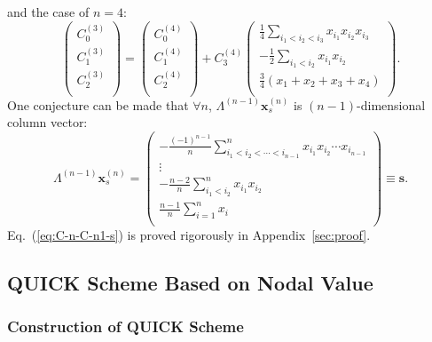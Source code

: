 \documentclass[]{article}
\def\Matrix#1{\left(#1\right)}
\def\Matrix#1{\left(#1\right)}
\begin{document}
and the case of $n=4$:
\[
\Matrix{\begin{array}{c}C_0^{(3)}\\ C_1^{(3)}\\ C_2^{(3)}\\ \end{array}}=
\Matrix{\begin{array}{c}C_0^{(4)}\\ C_1^{(4)}\\ C_2^{(4)}\\ \end{array}}
+C_3^{(4)}\Matrix{\begin{array}{c} \frac{1}{4}\sum_{i_1<i_2<i_3} x_{i_1}x_{i_2}x_{i_3} \\ -\frac{1}{2}\sum_{i_1<i_2} x_{i_1}x_{i_2} \\ \frac{3}{4}(x_1+x_2+x_3+x_4) \\ \end{array}}.
\]
One conjecture can be made that $\forall n$, $\Lambda^{(n-1)}\bm x_s^{(n)}$ is
$(n-1)$-dimensional column vector:
\begin{equation}
\Lambda^{(n-1)}\bm x_s^{(n)}=\Matrix{\begin{array}{r}
\displaystyle
-\frac{(-1)^{n-1}}{n}\sum_{i_1<i_2<\cdots<i_{n-1}}^n x_{i_1}x_{i_2}\cdots x_{i_{n-1}} \\
\vdots\hspace{1cm} \\
\displaystyle
-\frac{n-2}{n}\sum_{i_1<i_2}^n x_{i_1}x_{i_2} \\[5mm]
\displaystyle
\frac{n-1}{n}\sum_{i=1}^n x_i \\
\end{array}}\equiv\bm s.
\label{eq:C-n-C-n1-s}
\end{equation}
Eq.~(\ref{eq:C-n-C-n1-s}) is proved rigorously in Appendix~\ref{sec:proof}.


\subsection{QUICK Scheme Based on Nodal Value}\label{sec:QUICK-nodal-val}
\subsubsection{Construction of QUICK Scheme}
\end{document}
